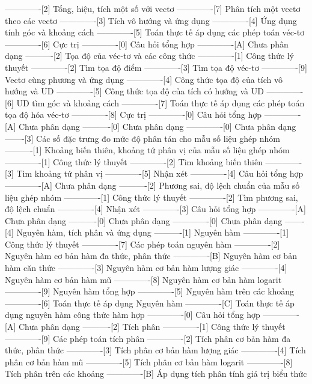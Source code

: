 -------------[2] Tổng, hiệu, tích một số với vectơ
-------------[7] Phân tích một vectơ theo các vectơ
-------------[3] Tích vô hướng và ứng dụng
-------------[4] Ứng dụng tính góc và khoảng cách
-------------[5] Toán thực tế áp dụng các phép toán véc-tơ
-------------[6] Cực trị 
-------------[0] Câu hỏi tổng hợp
-------------[A] Chưa phân dạng
----------[2] Tọa độ của véc-tơ và các công thức
-------------[1] Công thức lý thuyết
-------------[2] Tìm tọa độ điểm
-------------[3] Tìm tọa độ véc-tơ
-------------[9] Vectơ cùng phương và ứng dụng
-------------[4] Công thức tọa độ của tích vô hướng và UD
-------------[5] Công thức tọa độ của tích có hướng và UD
-------------[6] UD tìm góc và khoảng cách
-------------[7] Toán thực tế áp dụng các phép toán tọa độ hóa véc-tơ
-------------[8] Cực trị
-------------[0] Câu hỏi tổng hợp
-------------[A] Chưa phân dạng
----------[0] Chưa phân dạng
-------------[0] Chưa phân dạng
-------[3] Các số đặc trưng đo mức độ phân tán cho mẫu số liệu ghép nhóm
----------[1] Khoảng biến thiên, khoảng tứ phân vị của mẫu số liệu ghép nhóm
-------------[1] Công thức lý thuyết
-------------[2] Tìm khoảng biến thiên 
-------------[3] Tìm khoảng tứ phân vị
-------------[5] Nhận xét
-------------[4] Câu hỏi tổng hợp
-------------[A] Chưa phân dạng
----------[2] Phương sai, độ lệch chuẩn của mẫu số liệu ghép nhóm
-------------[1] Công thức lý thuyết
-------------[2] Tìm phương sai, độ lệch chuẩn
-------------[4] Nhận xét
-------------[3] Câu hỏi tổng hợp
-------------[A] Chưa phân dạng
----------[0] Chưa phân dạng
-------------[0] Chưa phân dạng
-------[4] Nguyên hàm, tích phân và ứng dụng
----------[1] Nguyên hàm
-------------[1] Công thức lý thuyết
-------------[7] Các phép toán nguyên hàm
-------------[2] Nguyên hàm cơ bản hàm đa thức, phân thức
-------------[B] Nguyên hàm cơ bản hàm căn thức
-------------[3] Nguyên hàm cơ bản hàm lượng giác
-------------[4] Nguyên hàm cơ bản hàm mũ
-------------[8] Nguyên hàm cơ bản hàm logarit
-------------[9] Nguyên hàm tổng hợp
-------------[5] Nguyên hàm trên các khoảng
-------------[6] Toán thực tế áp dụng Nguyên hàm
-------------[C] Toán thực tế áp dụng nguyên hàm công thức hàm hợp
-------------[0] Câu hỏi tổng hợp
-------------[A] Chưa phân dạng
----------[2] Tích phân
-------------[1] Công thức lý thuyết
-------------[9] Các phép toán tích phân
-------------[2] Tích phân cơ bản hàm đa thức, phân thức
-------------[3] Tích phân cơ bản hàm lượng giác
-------------[4] Tích phân cơ bản hàm mũ
-------------[5] Tích phân cơ bản hàm logarit
-------------[8] Tích phân trên các khoảng
-------------[B] Áp dụng tích phân tính giá trị biểu thức 
